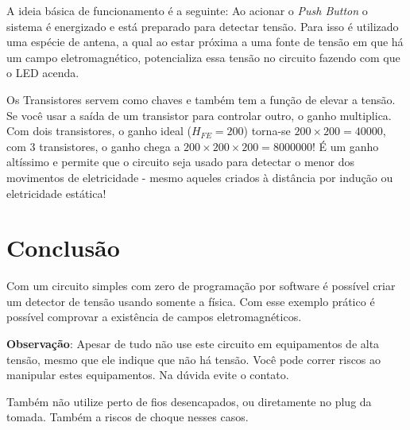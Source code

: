 A ideia básica de funcionamento é a seguinte: Ao acionar o \emph{Push
Button} o sistema é energizado e está preparado para detectar tensão.
Para isso é utilizado uma espécie de antena, a qual ao estar próxima a
uma fonte de tensão em que há um campo eletromagnético, potencializa
essa tensão no circuito fazendo com que o LED acenda.

Os Transistores servem como chaves e também tem a função de elevar a
tensão. Se você usar a saída de um transistor para controlar outro, o
ganho multiplica. Com dois transistores, o ganho ideal ($H_{FE} = 200$)
torna-se $200 \times 200 = 40000$, com 3 transistores, o ganho chega a
$200 \times 200 \times 200 = 8000000$! É um ganho altíssimo e permite
que o circuito seja usado para detectar o menor dos movimentos de
eletricidade - mesmo aqueles criados à distância por indução ou
eletricidade estática!

\section{Conclusão}\label{conclusuxe3o}

Com um circuito simples com zero de programação por software é possível
criar um detector de tensão usando somente a física. Com esse exemplo
prático é possível comprovar a existência de campos eletromagnéticos.

\textbf{Observação}: Apesar de tudo não use este circuito em
equipamentos de alta tensão, mesmo que ele indique que não há tensão.
Você pode correr riscos ao manipular estes equipamentos. Na dúvida evite
o contato.

Também não utilize perto de fios desencapados, ou diretamente no plug da
tomada. Também a riscos de choque nesses casos.
